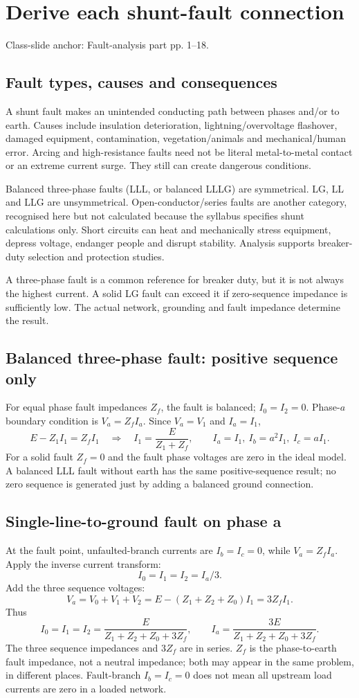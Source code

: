 \documentclass[11pt,a4paper]{article}
\newenvironment{Caution}[1]{\begin{tcolorbox}[colback=warm,colframe=rust,coltitle=white,title={#1}]}{\end{tcolorbox}}
\newcommand{\slides}[1]{{\small\color{muted}\textsf{Class-slide anchor: #1.}}\par}
\newcommand{\chapterstart}[2]{\clearpage\section{#1}\label{#2}}
\newcommand{\ans}[1]{\boxed{#1}}
\begin{document}
\chapterstart{Derive each shunt-fault connection}{faults}
\slides{Fault-analysis part pp. 1--18}
\subsection{Fault types, causes and consequences}
A shunt fault makes an unintended conducting path between phases and/or to earth. Causes include insulation deterioration, lightning/overvoltage flashover, damaged equipment, contamination, vegetation/animals and mechanical/human error. Arcing and high-resistance faults need not be literal metal-to-metal contact or an extreme current surge. They still can create dangerous conditions.

Balanced three-phase faults (LLL, or balanced LLLG) are symmetrical. LG, LL and LLG are unsymmetrical. Open-conductor/series faults are another category, recognised here but not calculated because the syllabus specifies shunt calculations only. Short circuits can heat and mechanically stress equipment, depress voltage, endanger people and disrupt stability. Analysis supports breaker-duty selection and protection studies.
\begin{Caution}{Do not rank every fault by a universal severity rule}
A three-phase fault is a common reference for breaker duty, but it is not always the highest current. A solid LG fault can exceed it if zero-sequence impedance is sufficiently low. The actual network, grounding and fault impedance determine the result.
\end{Caution}

\subsection{Balanced three-phase fault: positive sequence only}
For equal phase fault impedances $Z_f$, the fault is balanced; $I_0=I_2=0$. Phase-$a$ boundary condition is $V_a=Z_fI_a$. Since $V_a=V_1$ and $I_a=I_1$,
\[
 E-Z_1I_1=Z_fI_1\quad\Rightarrow\quad
 \ans{I_1=\frac{E}{Z_1+Z_f}},\qquad
 I_a=I_1,\ I_b=a^2I_1,\ I_c=aI_1.
\]
For a solid fault $Z_f=0$ and the fault phase voltages are zero in the ideal model. A balanced LLL fault without earth has the same positive-sequence result; no zero sequence is generated just by adding a balanced ground connection.

\subsection{Single-line-to-ground fault on phase a}
At the fault point, unfaulted-branch currents are $I_b=I_c=0$, while $V_a=Z_fI_a$. Apply the inverse current transform:
\[
 I_0=I_1=I_2=I_a/3.
\]
Add the three sequence voltages:
\[
 V_a=V_0+V_1+V_2=E-(Z_1+Z_2+Z_0)I_1=3Z_fI_1.
\]
Thus
\[
 \ans{I_0=I_1=I_2=\frac{E}{Z_1+Z_2+Z_0+3Z_f}},\qquad
 \ans{I_a=\frac{3E}{Z_1+Z_2+Z_0+3Z_f}}.
\]
The three sequence impedances and $3Z_f$ are in series. $Z_f$ is the phase-to-earth fault impedance, not a neutral impedance; both may appear in the same problem, in different places. Fault-branch $I_b=I_c=0$ does not mean all upstream load currents are zero in a loaded network.
\end{document}
